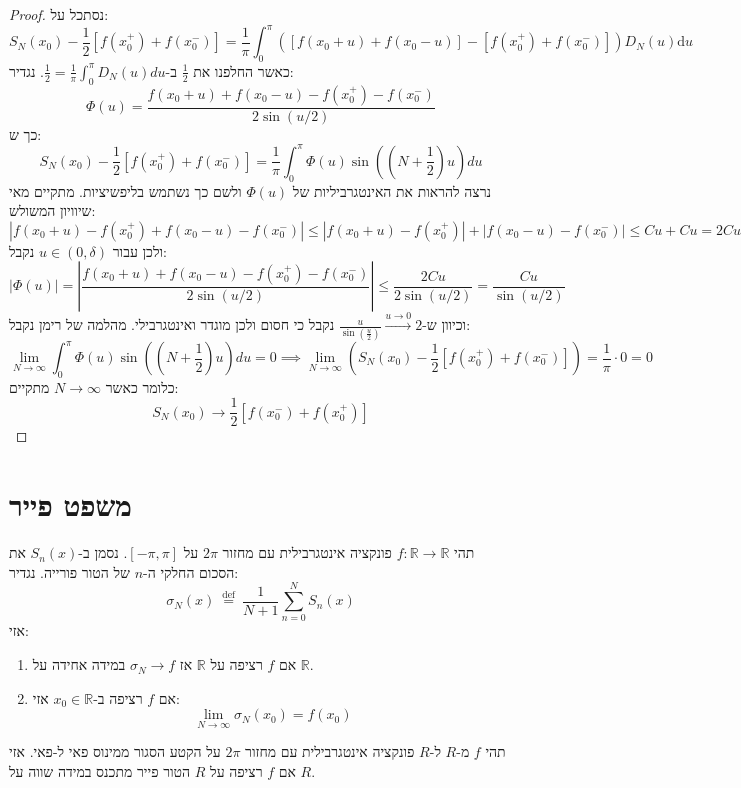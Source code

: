 \documentclass{tstextbook}
\begin{document}
\begin{proof}
נסתכל על:
$$S_{N}(x_{0})-\frac{1}{2}[f(x_{0}^{+})+f(x_{0}^{-})]=\frac{1}{\pi}\int_{0}^{\pi}\left([f(x_{0}+u)+f(x_{0}-u)]-[f(x_{0}^{+})+f(x_{0}^{-})]\right)D_{N}(u)\mathrm{d} u$$
כאשר החלפנו את \(\frac{1}{2}\) ב-\(\frac{1}{2}=\frac{1}{\pi}\int_{0}^{\pi}D_{N}(u)d u\). נגדיר:
$$\Phi(u) = \frac{f(x_0+u)+f(x_0-u)-f(x_0^{+})-f(x_0^{-})}{2\sin(u/2)}$$
כך ש:
$$S_{N}(x_{0})-\frac{1}{2}[f(x_{0}^{+})+f(x_{0}^{-})]=\frac{1}{\pi}\int_{0}^{\pi}\Phi(u)\sin\left(\left(N+\frac{1}{2}\right)u\right)d u$$
נרצה להראות את האינטגרביליות של \(\Phi(u)\) ולשם כך נשתמש בליפשיציות. מתקיים מאי שיוויון המשולש:
$$|f(x_{0}+u)-f(x_{0}^{+})+f(x_{0}-u)-f(x_{0}^{-})|\leq|f(x_{0}+u)-f(x_{0}^{+})|+|f(x_{0}-u)-f(x_{0}^{-})|\leq C u+C u=2C u$$
ולכן עבור \(u \in (0,\delta)\) נקבל:
$$|\Phi(u)|=\left|{\frac{f(x_{0}+u)+f(x_{0}-u)-f(x_{0}^{+})-f(x_{0}^{-})}{2\sin(u/2)}}\right|\leq{\frac{2C u}{2\sin(u/2)}}={\frac{C u}{\sin(u/2)}}$$
וכיוון ש-\(\frac{u}{\sin\left( \frac{u}{2} \right)}\xrightarrow{u\to 0} 2\) נקבל כי חסום ולכן מוגדר ואינטגרבילי. 
מהלמה של רימן נקבל:
$$\operatorname*{lim}_{N\to\infty}\int_{0}^{\pi}\Phi(u)\sin\left(\left(N+\frac{1}{2}\right)u\right)d u=0\implies \operatorname*{lim}_{N\to\infty}\left(S_{N}(x_{0})-\frac{1}{2}[f(x_{0}^{+})+f(x_{0}^{-})]\right)=\frac{1}{\pi}\cdot0=0$$
כלומר כאשר \(N\to \infty\) מתקיים:
$$S_{N}(x_{0})\to\frac{1}{2}[f(x_{0}^{-})+f(x_{0}^{+})]$$

\end{proof}
\section{משפט פייר}

\begin{theorem}[פייר]
תהי \(f:\mathbb{R}\to \mathbb{R}\) פונקציה אינטגרבילית עם מחזור \(2\pi\) על \([-\pi,\pi]\). נסמן ב-\(S_{n}(x)\) את הסכום החלקי ה-\(n\) של הטור פורייה. נגדיר:
$$\sigma_{N}(x)\ {\stackrel{\mathrm{def}}{=}}\ {\frac{1}{N+1}}\sum_{n=0}^{N}S_{n}(x)$$
אזי:

  \begin{enumerate}
    \item אם \(f\) רציפה על \(\mathbb{R}\) אז \(\sigma_{N}\to f\) במידה אחידה על \(\mathbb{R}\). 


    \item אם \(f\) רציפה ב-\(x_{0} \in \mathbb{R}\) אזי: 
$$\lim_{ N \to \infty } \sigma_{N}(x_{0})=f(x_{0})$$


  \end{enumerate}
\end{theorem}
תהי \(f\) מ-\(R\) ל-\(R\) פונקציה אינטגרבילית עם מחזור \(2\pi\) על הקטע הסגור ממינוס פאי ל-פאי. אזי אם \(f\) רציפה על \(R\) הטור פייר מתכנס במידה שווה על \(R\).
\end{document}
